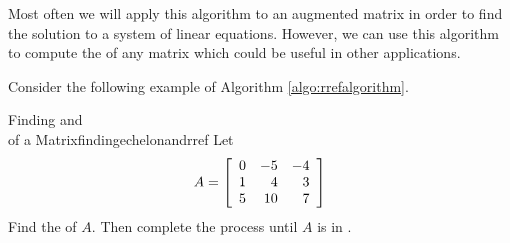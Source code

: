 Most often we will apply this algorithm to an augmented matrix in order to find the solution
to a system of linear equations. However, we can use this algorithm to compute the \rref \;of any matrix which could be useful in other applications.

Consider the following example of Algorithm \ref{algo:rrefalgorithm}.

\begin{example}{Finding \EF and \\ \RREF of a Matrix}{findingechelonandrref}
Let
\begin{equation*}
A = \left[
\begin{array}{rrr}
0 & -5 & -4 \\
1 & 4 & 3 \\
5 & 10 & 7
\end{array}
\right]
\end{equation*}
Find the \ef \;of $A$. Then complete
the process until $A$ is in \rref.
\end{example}

